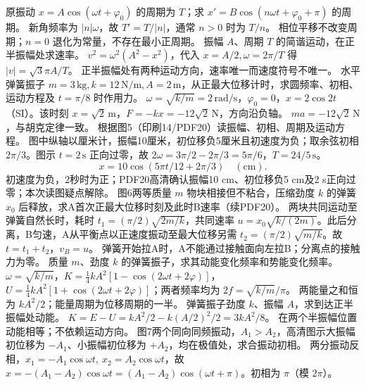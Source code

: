 \problemtext 原振动 $x=A\cos(\omega t+\varphi_0)$ 的周期为 $T$；求 $x'=B\cos(n\omega t+\varphi_0+\pi)$ 的周期。
\workings 新角频率为 $|n|\omega$，故 $T'=T/|n|$，通常 $n>0$ 时为 $T/n$。
\crosscheck 相位平移不改变周期；$n=0$ 退化为常量，不存在最小正周期。
\problemtext 振幅 $A$、周期 $T$ 的简谐运动，在正半振幅处求速率。
\workings $v^2=\omega^2(A^2-x^2)$，代入 $x=A/2,\omega=2\pi/T$ 得 $|v|=\sqrt3\pi A/T$。
\crosscheck 正半振幅处有两种运动方向，速率唯一而速度符号不唯一。
\problemtext 水平弹簧振子 $m=3\,\mathrm{kg},k=12\,\mathrm{N/m},A=2\,\mathrm m$，从正最大位移计时，求圆频率、初相、运动方程及 $t=\pi/8$ 时作用力。
\workings $\omega=\sqrt{k/m}=2\,\mathrm{rad/s}$，$\varphi_0=0$，$x=2\cos2t$（SI）。该时刻 $x=\sqrt2\,\mathrm m$，$F=-kx=-12\sqrt2\,\mathrm N$，方向沿负轴。
\crosscheck $ma=-12\sqrt2\,\mathrm N$，与胡克定律一致。
\problemtext 根据图5（印刷14/PDF20）读振幅、初相、周期及运动方程。
\workings 图中纵轴以厘米计，振幅10厘米，初位移负5厘米且初速度为负；取余弦初相 $2\pi/3$。图示 $t=2\,\mathrm s$ 正向过零，故 $2\omega=3\pi/2-2\pi/3=5\pi/6$，$T=24/5\,\mathrm s$。
\[
x=10\cos(5\pi t/12+2\pi/3)\quad(\mathrm{cm}).
\]
\crosscheck 初速度为负，2秒时为正；PDF20高清确认振幅10 cm、初位移负5 cm及2 s正向过零；本次读图疑点解除。
\problemtext 图6两等质量 $m$ 物块相接但不粘合，压缩劲度 $k$ 的弹簧 $x_0$ 后释放，求A首次正最大位移时刻及此时B速率（续PDF20）。
\workings 两块共同运动至弹簧自然长时，耗时 $t_1=(\pi/2)\sqrt{2m/k}$，共同速率 $u=x_0\sqrt{k/(2m)}$。此后分离，B匀速，A从平衡点以正速度振动至最大位移另需 $t_2=(\pi/2)\sqrt{m/k}$。故 $t=t_1+t_2$，$v_B=u$。
\crosscheck 弹簧开始拉A时，A不能通过接触面向左拉B；分离点的接触力为零。
\problemtext 质量 $m$、劲度 $k$ 的弹簧振子，求其动能变化频率和势能变化频率。
\workings $\omega=\sqrt{k/m}$，$K=\frac14kA^2[1-\cos(2\omega t+2\varphi)]$，$U=\frac14kA^2[1+\cos(2\omega t+2\varphi)]$；两者频率均为 $2f=\sqrt{k/m}/\pi$。
\crosscheck 两能量之和恒为 $kA^2/2$；能量周期为位移周期的一半。
\problemtext 弹簧振子劲度 $k$、振幅 $A$，求到达正半振幅处动能。
\workings $K=E-U=kA^2/2-k(A/2)^2/2=3kA^2/8$。
\crosscheck 在两个半振幅位置动能相等；不依赖运动方向。
\problemtext 图7两个同向同频振动，$A_1>A_2$，高清图示大振幅初位移为 $-A_1$、小振幅初位移为 $+A_2$，均在极值处，求合振动初相。
\workings 两分振动反相，$x_1=-A_1\cos\omega t,\ x_2=A_2\cos\omega t$，故 $x=-(A_1-A_2)\cos\omega t=(A_1-A_2)\cos(\omega t+\pi)$。初相为 $\pi$（模 $2\pi$）。

